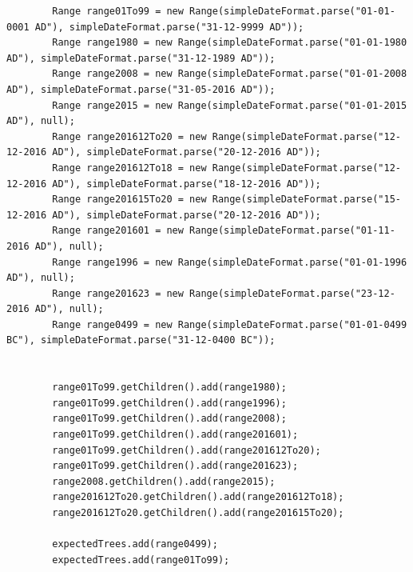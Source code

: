\begin{lstlisting}
        Range range01To99 = new Range(simpleDateFormat.parse("01-01-0001 AD"), simpleDateFormat.parse("31-12-9999 AD"));
        Range range1980 = new Range(simpleDateFormat.parse("01-01-1980 AD"), simpleDateFormat.parse("31-12-1989 AD"));
        Range range2008 = new Range(simpleDateFormat.parse("01-01-2008 AD"), simpleDateFormat.parse("31-05-2016 AD"));
        Range range2015 = new Range(simpleDateFormat.parse("01-01-2015 AD"), null);
        Range range201612To20 = new Range(simpleDateFormat.parse("12-12-2016 AD"), simpleDateFormat.parse("20-12-2016 AD"));
        Range range201612To18 = new Range(simpleDateFormat.parse("12-12-2016 AD"), simpleDateFormat.parse("18-12-2016 AD"));
        Range range201615To20 = new Range(simpleDateFormat.parse("15-12-2016 AD"), simpleDateFormat.parse("20-12-2016 AD"));
        Range range201601 = new Range(simpleDateFormat.parse("01-11-2016 AD"), null);
        Range range1996 = new Range(simpleDateFormat.parse("01-01-1996 AD"), null);
        Range range201623 = new Range(simpleDateFormat.parse("23-12-2016 AD"), null);
        Range range0499 = new Range(simpleDateFormat.parse("01-01-0499 BC"), simpleDateFormat.parse("31-12-0400 BC"));


        range01To99.getChildren().add(range1980);
        range01To99.getChildren().add(range1996);
        range01To99.getChildren().add(range2008);
        range01To99.getChildren().add(range201601);
        range01To99.getChildren().add(range201612To20);
        range01To99.getChildren().add(range201623);
        range2008.getChildren().add(range2015);
        range201612To20.getChildren().add(range201612To18);
        range201612To20.getChildren().add(range201615To20);

        expectedTrees.add(range0499);
        expectedTrees.add(range01To99);


\end{lstlisting}
